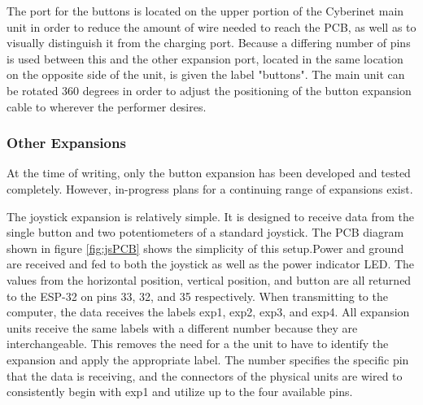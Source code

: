 The port for the buttons is located on the upper portion of the Cyberinet main unit in order to reduce the amount of wire needed to reach the PCB, as well as to visually distinguish it from the charging port. Because a differing number of pins is used between this and the other expansion port, located in the same location on the opposite side of the unit, is given the label "buttons". The main unit can be rotated 360 degrees in order to adjust the positioning of the button expansion cable to wherever the performer desires.

\subsubsection{Other Expansions}
At the time of writing, only the button expansion has been developed and tested completely. However, in-progress plans for a continuing range of expansions exist.

The joystick expansion is relatively simple. It is designed to receive data from the single button and two potentiometers of a standard joystick. The PCB diagram shown in figure \ref{fig:jsPCB} shows the simplicity of this setup.Power and ground are received and fed to both the joystick as well as the power indicator LED. The values from the horizontal position, vertical position, and button are all returned to the ESP-32 on pins 33, 32, and 35 respectively. When transmitting to the computer, the data receives the labels exp1, exp2, exp3, and exp4. All expansion units receive the same labels with a different number because they are interchangeable. This removes the need for a the unit to have to identify the expansion and apply the appropriate label. The number specifies the specific pin that the data is receiving, and the connectors of the physical units are wired to consistently begin with exp1 and utilize up to the four available pins.

